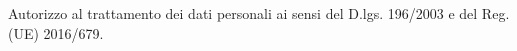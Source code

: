 \bigskip
\begin{cvparagraph}
	Autorizzo al trattamento dei dati personali ai sensi del D.lgs. 196/2003 e del Reg.(UE) 2016/679.
\end{cvparagraph}